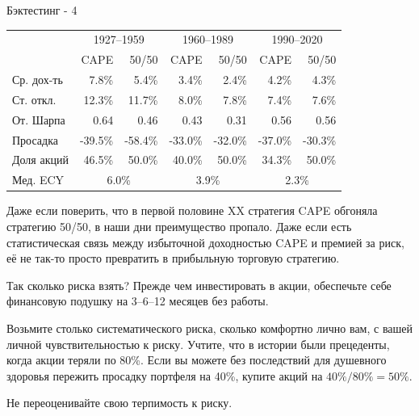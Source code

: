 \documentclass{beamer}
\begin{document}
\begin{frame}{Бэктестинг - 4}
\centering
{\small
\begin{tabular}{l|r|r|r|r|r|r}
& \multicolumn{2}{c|}{1927--1959} & \multicolumn{2}{c|}{1960--1989} & \multicolumn{2}{c}{1990--2020} \\ 
\cline{2-7}
                   & CAPE    & 50/50 & CAPE    & 50/50 & CAPE    & 50/50 \\   \hline
Ср. дох-ть &  7.8\% &   5.4\%  &   3.4\% &   2.4\%   &   4.2\% &   4.3\%   \\
Ст. откл.  &  12.3\% &   11.7\%  &  8.0\% &  7.8\%   &  7.4\% &  7.6\%   \\
От. Шарпа  &   0.64  &   0.46    &   0.43  &   0.31    &   0.56  &   0.56    \\
Просадка   & -39.5\% & -58.4\%   & -33.0\% & -32.0\%   & -37.0\% & -30.3\% \\
Доля акций &  46.5\% & 50.0\%   &  40.0\% & 50.0\%   &  34.3\% & 50.0\%  \\ 
\cline{2-7}
Мед. ECY   & \multicolumn{2}{c|}{6.0\%} & \multicolumn{2}{c|}{3.9\%} & \multicolumn{2}{c}{2.3\%} 
\end{tabular}
}

\justify
Даже если поверить, что в первой половине XX стратегия CAPE обгоняла стратегию
50/50, в наши дни преимущество пропало. Даже если есть статистическая связь 
между избыточной доходностью CAPE и премией за риск, её не так-то просто 
превратить в прибыльную торговую стратегию.
\end{frame}



\begin{frame}{Так сколько риска взять?}
\justify
Прежде чем инвестировать в акции, обеспечьте себе финансовую подушку на 
3--6--12 месяцев без работы.

\justify
Возьмите столько систематического риска, сколько комфортно лично вам, с вашей 
личной чувствительностью к риску. Учтите, что в истории были прецеденты, когда 
акции теряли по 80\%. Если вы можете без последствий для душевного здоровья 
пережить просадку портфеля на 40\%, купите акций на $40\% / 80\% = 50\%$.

\justify
Не переоценивайте свою терпимость к риску.

\end{frame}
\end{document}
